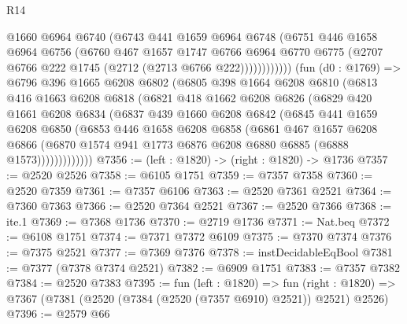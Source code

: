 \begin{lexlean}{R14}
\begin{coremodule}
                    @1660
                    @6964
                    @6740
                    (@6743
                      @441
                      @1659
                      @6964
                      @6748
                      (@6751
                        @446
                        @1658
                        @6964
                        @6756
                        (@6760
                          @467
                          @1657
                          @1747
                          @6766
                          @6964
                          @6770
                          @6775
                          (@2707 @6766 @222 @1745 (@2712 (@2713 @6766 @222))))))))))))
        (fun (d0 : @1769) =>
        @6796
          @396
          @1665
          @6208
          @6802
          (@6805
            @398
            @1664
            @6208
            @6810
            (@6813
              @416
              @1663
              @6208
              @6818
              (@6821
                @418
                @1662
                @6208
                @6826
                (@6829
                  @420
                  @1661
                  @6208
                  @6834
                  (@6837
                    @439
                    @1660
                    @6208
                    @6842
                    (@6845
                      @441
                      @1659
                      @6208
                      @6850
                      (@6853
                        @446
                        @1658
                        @6208
                        @6858
                        (@6861
                          @467
                          @1657
                          @6208
                          @6866
                          (@6870 @1574 @941 @1773 @6876 @6208 @6880 @6885 (@6888 @1573)))))))))))))
@7356 := (left : @1820) -> (right : @1820) -> @1736
@7357 := @2520 @2526
@7358 := @6105 @1751
@7359 := @7357 @7358
@7360 := @2520 @7359
@7361 := @7357 @6106
@7363 := @2520 @7361 @2521
@7364 := @7360 @7363
@7366 := @2520 @7364 @2521
@7367 := @2520 @7366
@7368 := ite.{1}
@7369 := @7368 @1736
@7370 := @2719 @1736
@7371 := Nat.beq
@7372 := @6108 @1751
@7374 := @7371 @7372 @6109
@7375 := @7370 @7374
@7376 := @7375 @2521
@7377 := @7369 @7376
@7378 := instDecidableEqBool
@7381 := @7377 (@7378 @7374 @2521)
@7382 := @6909 @1751
@7383 := @7357 @7382
@7384 := @2520 @7383
@7395 := fun (left : @1820) =>
  fun (right : @1820) => @7367 (@7381 (@2520 (@7384 (@2520 (@7357 @6910) @2521)) @2521) @2526)
@7396 := @2579 @66

\end{coremodule}
\end{lexlean}
